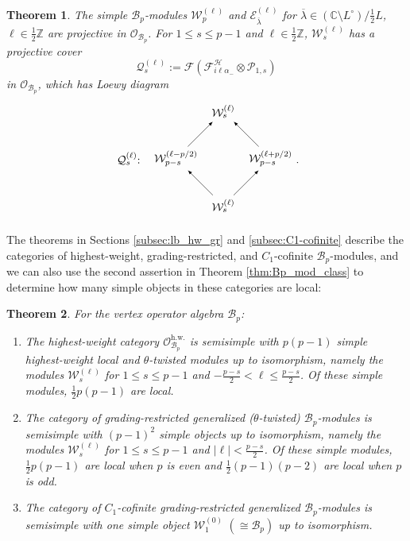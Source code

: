 \documentclass[11pt, reqno]{amsart}
\newtheorem{thm}{Theorem}[section]
\theoremstyle{definition}\newtheorem{defi}[thm]{Definition}
\theoremstyle{definition}\newtheorem{rem}[thm]{Remark}
\theoremstyle{definition}\newtheorem{exam}[thm]{Example}
\theoremstyle{definition}\newtheorem{assum}[thm]{Assumption}
\newcommand{\cB}{\mathcal{B}}
\newcommand{\cE}{\mathcal{E}}
\newcommand{\cH}{\mathcal{H}}
\newcommand{\cF}{\mathcal{F}}
\newcommand{\cO}{\mathcal{O}}
\newcommand{\cP}{\mathcal{P}}
\newcommand{\cW}{\mathcal{W}}
\newcommand{\CC}{\mathbb{C}}
\newcommand{\ZZ}{\mathbb{Z}}
\begin{document}
\begin{thm}\label{thm:Bp_proj_modules}
The simple $\mathcal{B}_p$-modules $\cW_p^{(\ell)}$ and $\cE_{\overline{\lambda}}^{(\ell)}$ for $\overline{\lambda}\in(\CC\setminus L^\circ)\big/\frac{1}{2}L$, $\ell\in\frac{1}{2}\ZZ$ are projective in $\cO_{\mathcal{B}_p}$. For $1\leq s\leq p-1$ and $\ell\in\frac{1}{2}\ZZ$, $\cW_{s}^{(\ell)}$ has a projective cover
 \begin{equation*}
  \mathcal{Q}_{s}^{(\ell)}:=\cF\left(\cF^\cH_{i\ell\alpha_-}\otimes\cP_{1,s}\right)
 \end{equation*}
in $\cO_{\mathcal{B}_p}$, which has Loewy diagram
\begin{equation}\label{eqn:Qsl_Loewy_diag}
 \begin{matrix}
  \begin{tikzpicture}[->,>=latex,scale=1.5]
\node (b1) at (1,0) {$\cW_{s}^{(\ell)}$};
\node (c1) at (-1, 1){$\mathcal{Q}_{s}^{(\ell)}$:};
   \node (a1) at (0,1) {$\cW_{p-s}^{(\ell-p/2)}$};
   \node (b2) at (2,1) {$\cW_{p-s}^{(\ell+p/2)}$};
    \node (a2) at (1,2) {$\cW_{s}^{(\ell)}$};
\draw[] (b1) -- node[left] {} (a1);
   \draw[] (b1) -- node[left] {} (b2);
    \draw[] (a1) -- node[left] {} (a2);
    \draw[] (b2) -- node[left] {} (a2);
\end{tikzpicture}
\end{matrix} .
 \end{equation}
 \end{thm}
 
 The theorems in Sections \ref{subsec:lb_hw_gr} and \ref{subsec:C1-cofinite} describe the categories of highest-weight, grading-restricted, and $C_1$-cofinite $\cB_p$-modules, and we can also use the second assertion in Theorem \ref{thm:Bp_mod_class} to determine how many simple objects in these categories are local:
\begin{thm}\label{thm:Bp_grad-rest}
For the vertex operator algebra $\cB_p$:
\begin{enumerate}
\item The highest-weight category $\cO^{\mathrm{h.w.}}_{\cB_p}$ is semisimple with $p(p-1)$ simple highest-weight local and $\theta$-twisted modules up to isomorphism, namely the modules $\cW_s^{(\ell)}$ for $1\leq s\leq p-1$ and $-\frac{p-s}{2}<\ell\leq\frac{p-s}{2}$. Of these simple modules, $\frac{1}{2}p(p-1)$ are local.

\item The category of grading-restricted generalized  ($\theta$-twisted) $\cB_p$-modules is semisimple with $(p-1)^2$ simple objects up to isomorphism, namely the modules $\cW_s^{(\ell)}$ for $1\leq s\leq p-1$ and $\vert\ell\vert<\frac{p-s}{2}$. Of these simple modules, $\frac{1}{2} p(p-1)$ are local when $p$ is even and $\frac{1}{2}(p-1)(p-2)$ are local when $p$ is odd.

\item The category of $C_1$-cofinite grading-restricted generalized $\cB_p$-modules is semisimple with one simple object $\cW_1^{(0)}\,\,(\cong\cB_p)$ up to isomorphism.
\end{enumerate}

\end{thm} 
 
\end{document}
